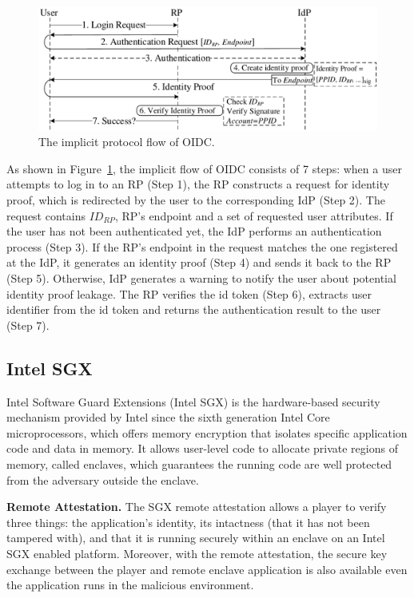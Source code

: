 \begin{figure}[t]
  \centering
  \includegraphics[width=\linewidth]{fig/OIDC1.pdf}
  \caption{The implicit protocol flow of OIDC.}
  \label{fig:OpenID}
\end{figure}

As shown in Figure~\ref{fig:OpenID}, the implicit flow of OIDC consists of 7 steps: when a user attempts to log in to an RP (Step 1), the RP constructs a request for identity proof, which is redirected by the user to the corresponding IdP (Step 2). The request contains $ID_{RP}$, RP's endpoint and a set of requested user attributes. If the user has not been authenticated yet, the IdP performs an authentication process (Step 3). If the RP's endpoint in the request matches the one registered at the IdP, it generates an identity proof (Step 4) and sends it back to the RP (Step 5). Otherwise, IdP generates a warning to notify the user about potential identity proof leakage. The RP verifies the id token (Step 6), extracts user identifier from the id token and returns the authentication result to the user (Step 7).

\subsection{Intel SGX}
Intel Software Guard Extensions (Intel SGX) is the hardware-based security  mechanism provided by Intel since the sixth generation Intel Core microprocessors, which offers memory encryption that isolates specific application code and data in memory.
It allows user-level code to allocate private regions of memory, called enclaves, which guarantees the running code are well protected from the adversary outside the enclave.
 
\noindent\textbf{Remote Attestation.} The SGX remote attestation allows a player to verify three things: the application's identity, its intactness (that it has not been tampered with), and that it is running securely within an enclave on an Intel SGX enabled platform. Moreover, with the remote attestation, the secure key exchange between the player and remote enclave application is also available even the application runs in the malicious environment.